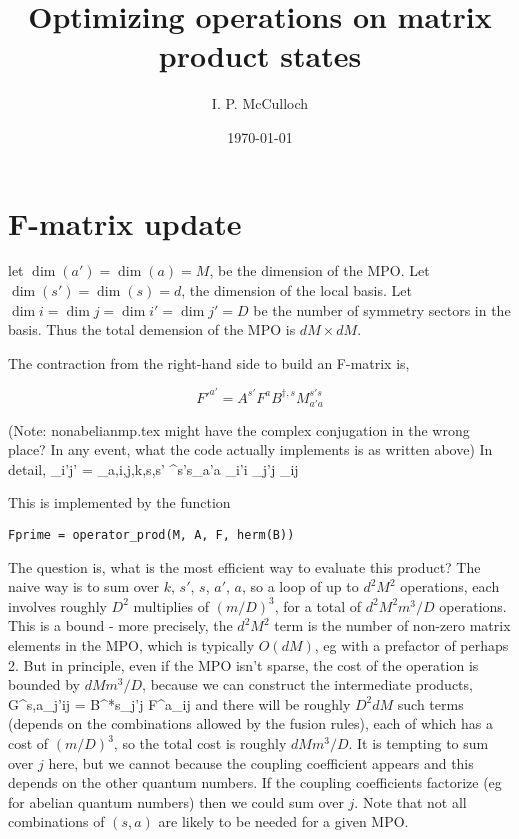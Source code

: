 \documentclass{article}[10pt]
\begin{document}
\title{Optimizing operations on matrix product states}

\author{I. P. McCulloch}
\date{\today}

\maketitle

\section{F-matrix update}

let $\dim(a') = \dim(a) = M$, be the dimension of the MPO. Let $\dim(s') = \dim(s) = d$, the dimension
of the local basis. Let $\dim{i} = \dim{j} = \dim{i'} = \dim{j'} = D$ be the number of symmetry sectors
in the basis. Thus the total demension of the MPO is $dM \times dM$.

The contraction from the right-hand side to build an F-matrix is,

\begin{equation}
F'^{a'} = A^{s'} F^a B^{\dagger,s} M^{s's}_{a'a}
\end{equation}

(Note: nonabelianmp.tex might have the complex conjugation in the wrong place? In any event,
what the code actually implements is as written above) In detail, 
\beq
{}_{i'j'} =
\sum_{a,i,j,k,s,s'}
^{s's}_{a'a} _{i'i} _{j'j} 
_{ij}
\eeq

This is implemented by the function 
\begin{verbatim}Fprime = operator_prod(M, A, F, herm(B))\end{verbatim}

The question is, what is the most efficient way to evaluate this product? The naive way is to sum over
$k$, $s'$, $s$, $a'$, $a$, so a loop of up to $d^2 M^2$ operations, each involves roughly $D^2$ multiplies
of $(m/D)^3$, for a total of $d^2 M^2 m^3 / D$ operations. This is a bound - more precisely, the
$d^2 M^2$ term is the number of non-zero matrix elements in the MPO, which is typically $O(dM)$, eg with 
a prefactor of perhaps 2. But in principle, even if the MPO isn't sparse, the cost of the operation is bounded
by $d M m^3 / D$, because we can construct the intermediate products,
\beq
G^{s,a}_{j'ij} = B^{*s}_{j'j} F^a_{ij}
\eeq
and there will be roughly $D^2 dM$ such terms (depends on the combinations allowed by the fusion rules), 
each of which has a cost of
$(m/D)^3$, so the total cost is roughly $dM m^3/D$.
It is tempting to sum over $j$ here, but we cannot because the coupling coefficient appears and
this depends on the other quantum numbers. If the coupling coefficients factorize (eg for abelian quantum numbers)
then we could sum over $j$. Note that not all combinations of $(s,a)$ are likely to be needed for a given MPO.
\end{document}

